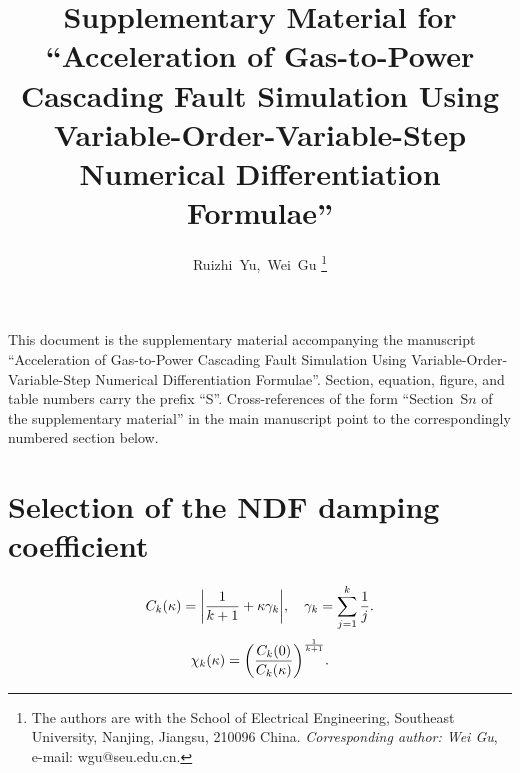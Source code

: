 \documentclass[journal,onecolumn]{IEEEtran}
\begin{document}
\title{Supplementary Material for\\ ``Acceleration of Gas-to-Power Cascading Fault Simulation Using Variable-Order-Variable-Step Numerical Differentiation Formulae''}
\author{Ruizhi~Yu,~Wei~Gu%
    \thanks{The authors are with the School of Electrical Engineering, Southeast University, Nanjing, Jiangsu, 210096 China. \emph{Corresponding author: Wei Gu}, e-mail: wgu@seu.edu.cn.}%
}
\maketitle

\noindent This document is the supplementary material accompanying the manuscript ``Acceleration of Gas-to-Power Cascading Fault Simulation Using Variable-Order-Variable-Step Numerical Differentiation Formulae''. Section, equation, figure, and table numbers carry the prefix ``S''. Cross-references of the form ``Section~S$n$ of the supplementary material'' in the main manuscript point to the correspondingly numbered section below.

\section{Selection of the NDF damping coefficient}
\label{app:kappa_selection}

\begin{equation}\label{eq:app_kappa_error_constant}
C_k(\kappa)=\qty|\frac{1}{k+1}+\kappa\gamma_k|,\quad
\gamma_k=\sum_{j=1}^{k}\frac{1}{j}.
\end{equation}
\begin{equation}\label{eq:app_kappa_step_ratio}
\chi_k(\kappa)=\qty(\frac{C_k(0)}{C_k(\kappa)})^{\frac{1}{k+1}}.
\end{equation}
\end{document}
